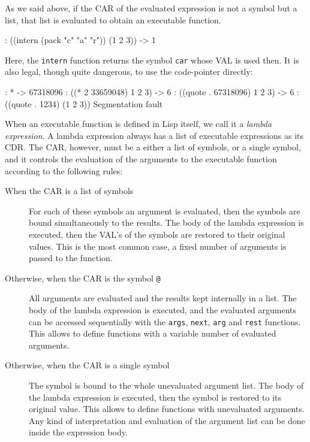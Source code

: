 As we said above, if the CAR of the evaluated expression is not a symbol
but a list, that list is evaluated to obtain an executable function.


\begin{wideverbatim}
: ((intern (pack "c" "a" "r")) (1 2 3))
-> 1
\end{wideverbatim}

Here, the \texttt{intern} function returns the symbol \texttt{car} whose VAL is used
then. It is also legal, though quite dangerous, to use the code-pointer
directly:


\begin{wideverbatim}
: *
-> 67318096
: ((* 2 33659048) 1 2 3)
-> 6
: ((quote . 67318096) 1 2 3)
-> 6
: ((quote . 1234) (1 2 3))
Segmentation fault
\end{wideverbatim}

When an executable function is defined in Lisp itself, we call it a
\emph{lambda expression}. A lambda expression always has a list of executable
expressions as its CDR. The CAR, however, must be a either a list of
symbols, or a single symbol, and it controls the evaluation of the
arguments to the executable function according to the following rules:


\begin{description}
\item[When the CAR is a list of symbols] For each of these symbols an
  argument is evaluated, then the symbols are bound simultaneously to
  the results. The body of the lambda expression is executed, then the
  VAL's of the symbols are restored to their original values. This is
  the most common case, a fixed number of arguments is passed to the
  function.
\item[Otherwise, when the CAR is the symbol \texttt{@}] All arguments
  are evaluated and the results kept internally in a list. The body of
  the lambda expression is executed, and the evaluated arguments can
  be accessed sequentially with the \texttt{args}, \texttt{next},
  \texttt{arg} and \texttt{rest} functions. This allows to define
  functions with a variable number of evaluated arguments.
\item[Otherwise, when the CAR is a single symbol] The symbol is bound
  to the whole unevaluated argument list. The body of the lambda
  expression is executed, then the symbol is restored to its original
  value. This allows to define functions with unevaluated arguments.
  Any kind of interpretation and evaluation of the argument list can
  be done inside the expression body.
\end{description}

